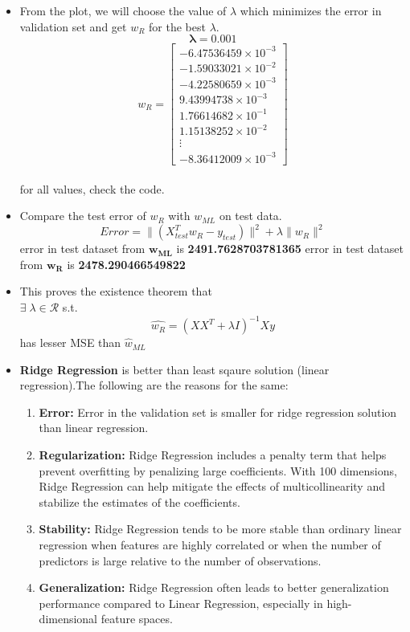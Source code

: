\documentclass[12pt, a4paper]{article}
\begin{document}
\begin{itemize}
\begin{figure}[ht]
        \caption{}
    \end{figure}
    \item \large From the plot, we will choose the value of $\lambda$ which minimizes the error in validation set and get $w_R$ for the best $\lambda$.
    \[\mathbf{\lambda=0.001}\]
    \[
     w_{R} = \begin{bmatrix}
     -6.47536459 \times 10^{-3} \\
     -1.59033021 \times 10^{-2} \\
     -4.22580659 \times 10^{-3} \\
     9.43994738 \times 10^{-3} \\
     1.76614682 \times 10^{-1} \\
     1.15138252 \times 10^{-2} \\
     \vdots \\
     -8.36412009 \times 10^{-3}
     \end{bmatrix}
    \]
    \\
    \large for all values, check the code.
    \item \large Compare the test error of $w_R$ with $w_{ML}$ on test data.
    \[Error=\|(X_{test}^Tw_R-y_{test})\|^2+\lambda\|w_R\|^2\]
    \centering error in test dataset from $\mathbf{w_{ML}}$ is \textbf{2491.7628703781365}
    \centering error in test dataset from $\mathbf{w_{R}}$ is \textbf{2478.290466549822}
    \raggedright
    \item \large This proves the existence theorem that\\
    $\exists\;\lambda\in\mathcal{R}$ s.t.
    \large \[\hat{w_R}  = (XX^T+\lambda I)^{-1}Xy\]
    \large has lesser MSE than $\hat{w}_{ML}$

    \item \large \textbf{Ridge Regression} is better than least sqaure solution (linear regression).The following are the reasons for the same:
    \begin{enumerate}
        \item \textbf{Error:} Error in the validation set is smaller for ridge regression solution than linear regression.
        \item \textbf{Regularization:} Ridge Regression includes a penalty term that helps prevent overfitting by penalizing large coefficients. With 100 dimensions, Ridge Regression can help mitigate the effects of multicollinearity and stabilize the estimates of the coefficients.
        \item \textbf{Stability:} Ridge Regression tends to be more stable than ordinary linear regression when features are highly correlated or when the number of predictors is large relative to the number of observations.
        \item \textbf{Generalization:} Ridge Regression often leads to better generalization performance compared to Linear Regression, especially in high-dimensional feature spaces.
    \end{enumerate}
\end{itemize}
\end{document}

